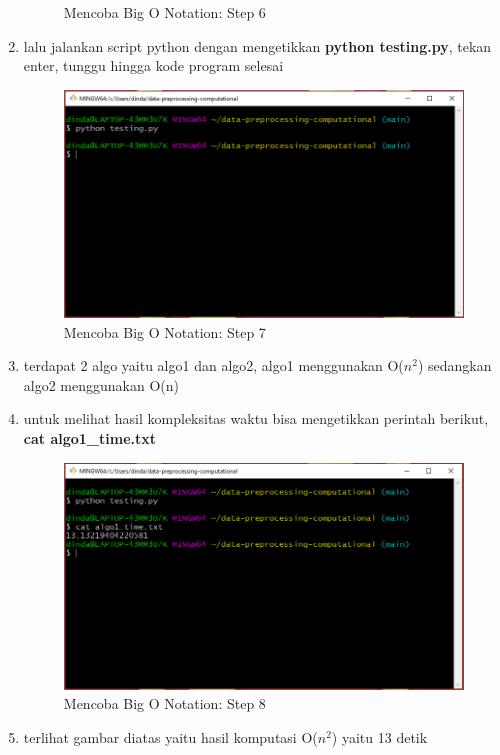 \begin{enumerate}
\begin{figure}[H]
        \caption{Mencoba Big O Notation: Step 6}
\end{figure}
\item lalu jalankan script python dengan mengetikkan \textbf{python testing.py}, tekan enter, tunggu hingga kode program selesai
\begin{figure}[H]
        \centerline{\includegraphics[scale=0.35]{figures/mencoba-computational/step7}}
        \caption{Mencoba Big O Notation: Step 7}
\end{figure}
\item terdapat 2 algo yaitu algo1 dan algo2, algo1 menggunakan O($n^2$) sedangkan algo2 menggunakan O(n)
\item untuk melihat hasil kompleksitas waktu bisa mengetikkan perintah berikut, \textbf{cat algo1\_time.txt}
\begin{figure}[H]
        \centerline{\includegraphics[scale=0.35]{figures/mencoba-computational/step8}}
        \caption{Mencoba Big O Notation: Step 8}
\end{figure}
\item terlihat gambar diatas yaitu hasil komputasi O($n^2$) yaitu 13 detik

\end{enumerate}
